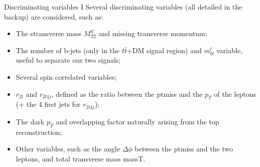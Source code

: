 \documentclass[8pt]{beamer}
\begin{document}
\begin{frame}{Discriminating variables I}
\justifying
\alert{Several discriminating variables} (all detailed in the backup) are considered, such as:
\begin{itemize}
\item The stransverse mass $M_{T2}^{ll}$ and missing transverse momentum;
\item The number of b-jets (only in the $t \bar t$+DM signal region) and $m_{bl}^t$ variable, useful to separate our two signals;
\item Several spin correlated variables;
\item $r_{2l}$ and $r_{2l4j}$, defined as the ratio between the ptmiss and the $p_T$ of the leptons (+ the 4 first jets for $r_{2l4j}$);
\item The dark $p_T$ and overlapping factor naturally arising from the top reconstruction;
\item Other variables, such as the angle $\Delta \phi$ between the ptmiss and the two leptons, and total transverse mass massT.
\end{itemize} \vfill

\vspace{10pt}
\begin{table}
\begin{center}
\end{center}
\end{table} \vfill	
\end{frame}
\end{document}

